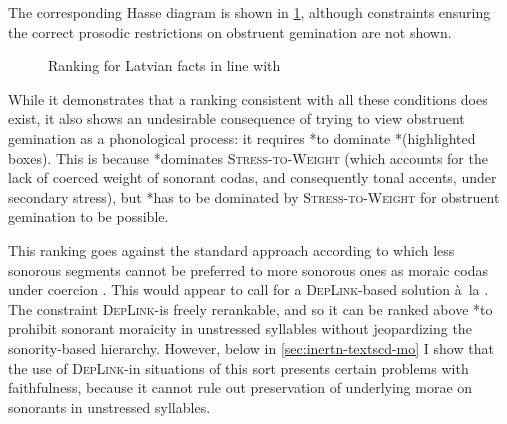 The corresponding Hasse diagram is shown in \cref{fig:latvian-bdl}, although constraints ensuring the correct prosodic restrictions on obstruent gemination are not shown. \begin{figure}[htp]
  \centering
  \caption{Ranking for Latvian facts in line with \citet{bye08}}
  \label{fig:latvian-bdl}
\end{figure} While it demonstrates that a ranking consistent with all these conditions does exist, it also shows an undesirable consequence of trying to view obstruent gemination as a phonological process: it requires *\mo[sonorant] to dominate * (highlighted boxes). This is because *\mo[sonorant] dominates \textsc{Stress\hyp to\hyp Weight} (which accounts for the lack of coerced weight of sonorant codas, and consequently tonal accents, under secondary stress), but * has to be dominated by \textsc{Stress\hyp to\hyp Weight} for obstruent gemination to be possible.

This ranking goes against the standard approach according to which less sonorous segments cannot be preferred to more sonorous ones as moraic codas under coercion \citep{zec88:_sonor,ot,delacy2006}. This would appear to call for a \textsc{DepLink}\hyp based solution à~la \citet{moren01:_distin}. The constraint \textsc{DepLink}-\mo[sonorant] is freely rerankable, and so it can be ranked above *\mo[voiceless] to prohibit sonorant moraicity in unstressed syllables without jeopardizing the sonority\hyp based hierarchy. However, below in \cref{sec:inertn-textscd-mo} I show that the use of \textsc{DepLink}-\mo[V] in situations of this sort presents certain problems with faithfulness, because it cannot rule out preservation of underlying morae on sonorants in unstressed syllables.

